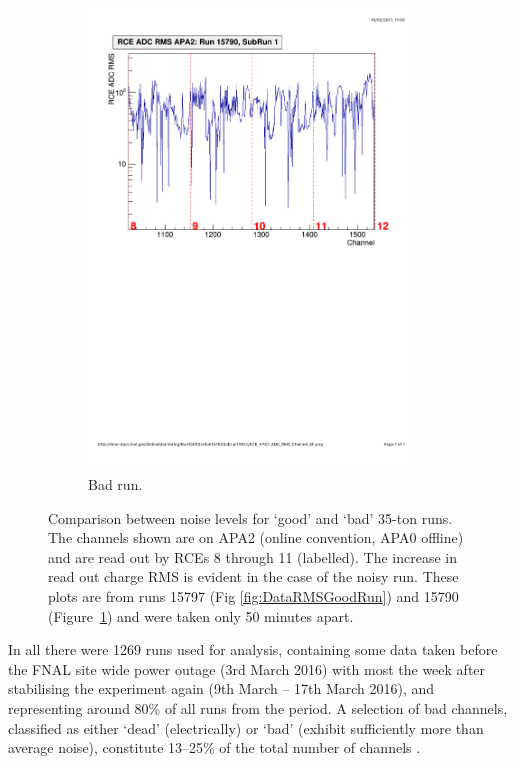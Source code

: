 \begin{figure}
\begin{subfigure}{0.45\linewidth}
    \includegraphics[width=0.95\textwidth]{DataRMSBad.pdf}
    \caption{Bad run.}
    \label{fig:DataRMSBadRun}
  \end{subfigure}
  \caption[Comparison between noise levels for `good' and `bad' 35-ton runs.]{Comparison between noise levels for `good' and `bad' 35-ton runs.  The channels shown are on APA2 (online convention, APA0 offline) and are read out by RCEs 8 through 11 (labelled).  The increase in read out charge RMS is evident in the case of the noisy run.  These plots are from runs 15797 (Fig \ref{fig:DataRMSGoodRun}) and 15790 (Figure~\ref{fig:DataRMSBadRun}) and were taken only 50 minutes apart.}
  \label{fig:DataRMS}
\end{figure}

In all there were 1269 runs used for analysis, containing some data taken before the FNAL site wide power outage (3rd March 2016) with most the week after stabilising the experiment again (9th March -- 17th March 2016), and representing around 80\% of all runs from the period.  A selection of bad channels, classified as either `dead' (electrically) or `bad' (exhibit sufficiently more than average noise), constitute 13--25\% of the total number of channels \cite{Kirby2016}.

